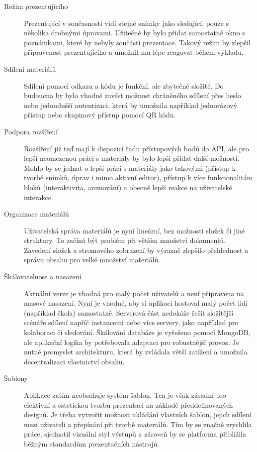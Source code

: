 \begin{description}
  \item[Režim prezentujícího] Prezentující v současnosti vidí stejné snímky jako sledující, pouze s několika drobnými úpravami. 
  Užitečné by bylo přidat samostatné okno s poznámkami, které by nebyly součástí prezentace. 
  Takový režim by zlepšil připravenost prezentujícího a umožnil mu lépe reagovat během výkladu.

  \item[Sdílení materiálů] Sdílení pomocí odkazu a kódu je funkční, ale zbytečně složité. 
  Do budoucna by bylo vhodné zavést možnost chráněného sdílení přes heslo nebo jednodušší autentizaci, která by umožnila například jednorázový přístup nebo skupinový přístup pomocí QR kódu.

  \item[Podpora rozšíření] Rozšíření již teď mají k dispozici řadu přístupových bodů do API, ale pro lepší neomezenou práci s materiály by bylo lepši přidat další možnosti.
  Mohlo by se jednat o lepší práci s materiály jako takovými (přístup k tvorbě snímků, úprav i mimo aktivní editor), přístup k více funkcionalitám bloků (interaktivita, animování) a obecně lepší reakce na uživatelské interakce.

  \item[Organizace materiálů] Uživatelská správa materiálů je nyní lineární, bez možnosti složek či jiné struktury. 
  To začíná být problém při větším množství dokumentů. 
  Zavedení složek a stromového zobrazení by výrazně zlepšilo přehlednost a správu obsahu pro velké množství materiálů.

  \item[Škálovatelnost a nasazení] Aktuální verze je vhodná pro malý počet uživatelů a není připravena na masové nasazení. 
  Nyní je vhodné, aby si aplikaci hostoval malý počet lidí (například škola) samostatně.
  Serverová část nedokáže řešit složitější scénáře sdílení napříč instancemi nebo více servery, jako například pro kolaboraci či sledování.
  Škálování databáze je vyřešeno pomocí MongoDB, ale aplikační logika by potřebovala adaptaci pro robustnější provoz. 
  Je nutné promyslet architekturu, která by zvládala větší zatížení a umožnila decentralizaci vlastnictví obsahu.

  \item[Šablony] Aplikace zatím neobsahuje systém šablon. 
  Ten je však zásadní pro efektivní a estetickou tvorbu prezentací na základě předdefinovaných designů. 
  Je třeba vytvořit možnost ukládání vlastních šablon, jejich sdílení mezi uživateli a přepínání při tvorbě materiálů. 
  Tím by se značně zrychlila práce, sjednotil vizuální styl výstupů a zároveň by se platforma přiblížila běžným standardům prezentačních nástrojů.


\end{description}
